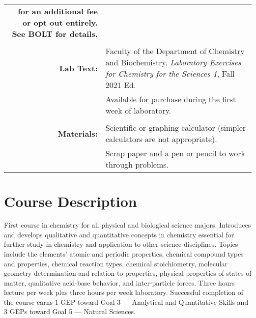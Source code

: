 \documentclass[11pt,letterpaper]{article}
\begin{document}
\begin{tabularx}{\linewidth} {@{\qquad}>{\bfseries\sffamily}r
	>{\raggedright\arraybackslash}X@{\qquad}}
	      for an additional fee or opt out entirely. See BOLT for details.
	      \\ \\
	Lab Text: & Faculty of the Department of Chemistry and
	Biochemistry. \textit{Laboratory Exercises for Chemistry for
			      the Sciences 1}, Fall 2021 Ed. \\
	       	      & \footnotesize Available for purchase during the first
		      week of laboratory. \\ \\
	Materials: & Scientific or graphing calculator (simpler calculators
	are not appropriate). \\
		   & Scrap paper and a pen or pencil to work through problems.
		   \\
	\bottomrule
\end{tabularx}

\section{Course Description}
First course in chemistry for all physical and biological science majors.
Introduces and develops qualitative and quantitative concepts in chemistry
essential for further study in chemistry and application to other science
disciplines. Topics include the elements' atomic and periodic properties,
chemical compound types and properties, chemical reaction types, chemical
stoichiometry, molecular geometry determination and relation to properties,
physical properties of states of matter, qualitative acid-base behavior, and
inter-particle forces. Three hours lecture per week plus three hours per week
laboratory. Successful completion of the course earns 1 GEP toward Goal 3 ---
Analytical and Quantitative Skills and 3 GEPs toward Goal 5 --- Natural
Sciences.
\end{document}
